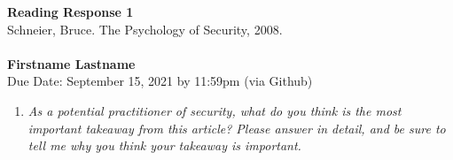 \documentclass[11pt]{article}
\begin{document}

\noindent
\large\textbf{Reading Response 1} \\  
\normalsize Schneier, Bruce.  The Psychology of Security, 2008.
\\ \\
\textbf{Firstname Lastname} \\
\normalsize  Due Date: September 15, 2021 by 11:59pm (via Github)

\begin{enumerate}
	\item \emph{As a potential practitioner of security, what do you think is the most important takeaway from this article?  Please answer in detail, and be sure to tell me why you think your takeaway is important.}
	
	
\end{enumerate}
\end{document}
